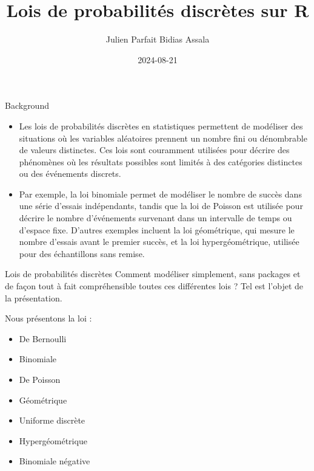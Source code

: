 \documentclass[
  ignorenonframetext,
]{beamer}
\title{Lois de probabilités discrètes sur R}
\author{Julien Parfait Bidias Assala}
\date{2024-08-21}
\providecommand{\tightlist}{%
  \setlength{\itemsep}{0pt}\setlength{\parskip}{0pt}}
\begin{document}
\frame{\titlepage}

\begin{frame}{Background}
\protect\hypertarget{background}{}
\begin{itemize}
\item
  Les lois de probabilités discrètes en statistiques permettent de
  modéliser des situations où les variables aléatoires prennent un
  nombre fini ou dénombrable de valeurs distinctes. Ces lois sont
  couramment utilisées pour décrire des phénomènes où les résultats
  possibles sont limités à des catégories distinctes ou des événements
  discrets.
\item
  Par exemple, la loi binomiale permet de modéliser le nombre de succès
  dans une série d'essais indépendants, tandis que la loi de Poisson est
  utilisée pour décrire le nombre d'événements survenant dans un
  intervalle de temps ou d'espace fixe. D'autres exemples incluent la
  loi géométrique, qui mesure le nombre d'essais avant le premier
  succès, et la loi hypergéométrique, utilisée pour des échantillons
  sans remise.
\end{itemize}
\end{frame}

\begin{frame}{Lois de probabilités discrètes}
\protect\hypertarget{lois-de-probabilituxe9s-discruxe8tes}{}
Comment modéliser simplement, sans packages et de façon tout à fait
compréhensible toutes ces différentes lois ? Tel est l'objet de la
présentation.

Nous présentons la loi :

\begin{itemize}
\tightlist
\item
  De Bernoulli
\item
  Binomiale
\item
  De Poisson
\item
  Géométrique
\item
  Uniforme discrète
\item
  Hypergéométrique
\item
  Binomiale négative
\end{itemize}
\end{frame}
\end{document}

